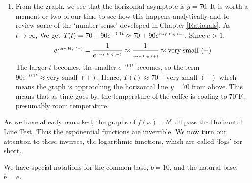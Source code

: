 {\begin{enumerate}
\item  From the graph, we see that the horizontal asymptote is $y = 70$. It is worth a moment or two of our time to see how this happens analytically and to review some of the `number sense' developed in Chapter \ref{Rationals}.  As $t \rightarrow \infty$, We get $T(t) = 70+90e^{-0.1t} \approx 70 +90e^{\mbox{\tiny very big $(-)$}}$.  Since $e > 1$, \[e^{\mbox{\tiny very big $(-)$}} = \frac{1}{e^{\mbox{\tiny very big $(+)$}}} \approx \frac{1}{\mbox{\tiny very big $(+)$}} \approx \mbox{very small $(+)$}\]  The larger $t$ becomes, the smaller $e^{-0.1t}$ becomes, so the term $90 e^{-0.1t} \approx \mbox{very small $(+)$}$.  Hence, $T(t) \approx 70 + \mbox{very small $(+)$}$ which means the graph is approaching the horizontal line $y=70$ from above.  This means that as time goes by, the temperature of the coffee is cooling to $70^{\circ}\mbox{F}$, presumably room temperature. 

\end{enumerate}
}

\medskip

As we have already remarked, the graphs of $f(x) = b^{x}$ all pass the Horizontal Line Test.  Thus the exponential functions are invertible.   We now turn our attention to these inverses, the logarithmic functions, which are called `logs' for short.

\smallskip


\smallskip

We have special notations for the common base, $b=10$, and the natural base, $b=e$.


\smallskip



